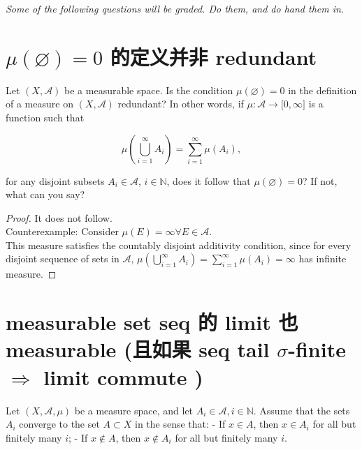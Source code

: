 \documentclass{qlnotes-export}
\begin{document}
\emph{Some of the following questions will be graded. Do them, and do hand them in}.

\section{\texorpdfstring{\(\mu(\varnothing) = 0\) 的定义并非 redundant}{\textbackslash mu(\textbackslash varnothing) = 0 的定义并非 redundant}}\label{muemptyset-0-ux7684ux5b9aux4e49ux5e76ux975e-redundant}

Let \((X,\mathcal{A})\) be a measurable space. Is the condition \(\mu(\varnothing) = 0\) in the definition of a measure on \((X,\mathcal{A})\) redundant? In other words, if \(\mu:\mathcal{A}\rightarrow\lbrack 0,\infty\rbrack\) is a function such that

\[\mu\left( {\bigcup\limits_{i = 1}^{\infty}A_{i}} \right) = \sum\limits_{i = 1}^{\infty}\mu(A_{i}),\]

for any disjoint subsets \(A_{i} \in \mathcal{A}\), \(i \in {\mathbb{N}}\), does it follow that \(\mu(\varnothing) = 0\)? If not, what can you say?

\begin{proof}

It does not follow.\\
Counterexample: Consider \(\mu(E) = \infty\forall E \in \mathcal{A}\).\\
This measure satisfies the countably disjoint additivity condition, since for every disjoint sequence of sets in \(\mathcal{A}\), \(\mu\left( {\bigcup_{i = 1}^{\infty}A_{i}} \right) = \sum_{i = 1}^{\infty}\mu(A_{i}) = \infty\) has infinite measure.

\end{proof}

\section{\texorpdfstring{measurable set seq 的 limit 也 measurable (且如果 seq tail \(\sigma\)-finite \(\Longrightarrow\) limit commute )}{measurable set seq 的 limit 也 measurable (且如果 seq tail \textbackslash sigma-finite \textbackslash Longrightarrow limit commute )}}\label{measurable-set-seq-ux7684-limit-ux4e5f-measurable-ux4e14ux5982ux679c-seq-tail-sigma-finite-implies-limit-commute}

Let \((X,\mathcal{A},\mu)\) be a measure space, and let \(A_{i} \in \mathcal{A},i \in {\mathbb{N}}\). Assume that the sets \(A_{i}\) converge to the set \(A \subset X\) in the sense that: - If \(x \in A\), then \(x \in A_{i}\) for all but finitely many \(i\); - If \(x \notin A\), then \(x \notin A_{i}\) for all but finitely many \(i\).
\end{document}
